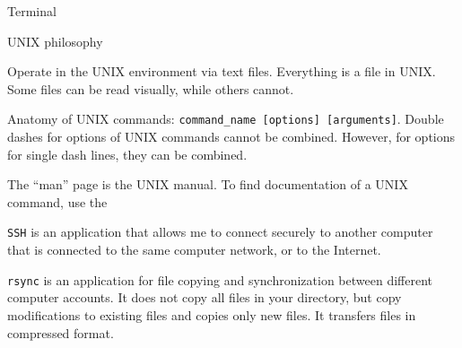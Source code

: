 Terminal 

UNIX philosophy

Operate in the UNIX environment via text files. Everything is a file in UNIX. Some files can be read visually, while others cannot.

Anatomy of UNIX commands: {\tt command\_name [options] [arguments]}. Double dashes for options of UNIX commands cannot be combined. However, for options for single dash lines, they can be combined.

The ``man'' page is the UNIX manual. To find documentation of a UNIX command, use the 

{\tt SSH} is an application that allows me to connect securely to another computer that is connected to the same computer network, or to the Internet.

{\tt rsync} is an application for file copying and synchronization between different computer accounts. It does not copy all files in your directory, but copy modifications to existing files and copies only new files. It transfers files in compressed format.



